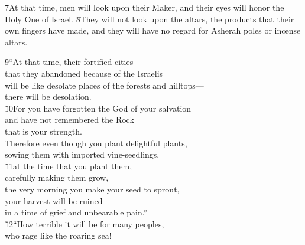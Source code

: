 \v{7}At that time, men will look upon their Maker, and their eyes will honor the Holy One of Israel. \v{8}They will not look upon the altars, the products that their own fingers have made, and they will have no regard for Asherah poles or incense altars.

\begin{poetry}
\poeml \v{9}``At that time, their fortified cities \\
\poemll    that they abandoned because of the Israelis \\
\poeml will be like desolate places of the forests and hilltops--- \\
\poemll    there will be desolation. \\
\poeml \v{10}For you have forgotten the God of your salvation \\
\poemll    and have not remembered the Rock \\
\poemlll       that is your strength. \\
\poeml Therefore even though you plant delightful plants, \\
\poemll    sowing them with imported vine-seedlings, \\
\poeml \v{11}at the time that you plant them, \\
\poemll    carefully making them grow, \\
\poeml the very morning you make your seed to sprout, \\
\poemll    your harvest will be ruined \\
\poemlll       in a time of grief and unbearable pain.'' \\
\poeml \v{12}``How terrible it will be for many peoples, \\
\poemll    who rage like the roaring sea! \\

\end{poetry}
